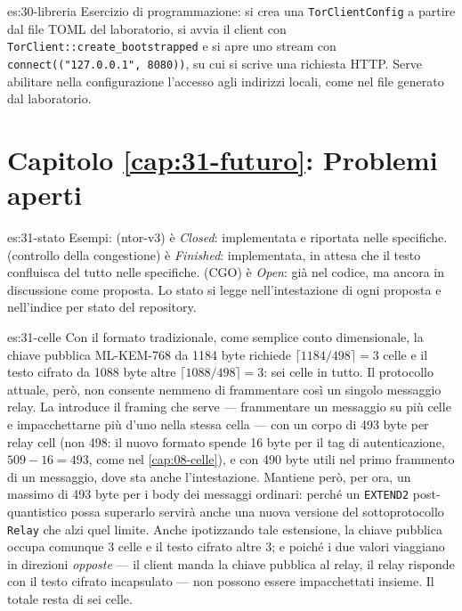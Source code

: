 \begin{soluzione}{es:30-libreria}
Esercizio di programmazione: si crea una \texttt{TorClientConfig} a partire dal file TOML del laboratorio, si avvia il client con \texttt{TorClient::create\_bootstrapped} e si apre uno stream con \texttt{connect(("127.0.0.1", 8080))}, su cui si scrive una richiesta HTTP. Serve abilitare nella configurazione l'accesso agli indirizzi locali, come nel file generato dal laboratorio.
\end{soluzione}

\section*{Capitolo \ref{cap:31-futuro}: Problemi aperti}

\begin{soluzione}{es:31-stato}
Esempi:  (ntor-v3) è \emph{Closed}: implementata e riportata nelle specifiche.  (controllo della congestione) è \emph{Finished}: implementata, in attesa che il testo confluisca del tutto nelle specifiche.  (CGO) è \emph{Open}: già nel codice, ma ancora in discussione come proposta. Lo stato si legge nell'intestazione di ogni proposta e nell'indice per stato del repository.
\end{soluzione}

\begin{soluzione}{es:31-celle}
Con il formato tradizionale, come semplice conto dimensionale, la chiave pubblica ML-KEM-768 da 1184 byte richiede $\lceil 1184/498 \rceil = 3$ celle e il testo cifrato da 1088 byte altre $\lceil 1088/498 \rceil = 3$: sei celle in tutto. Il protocollo attuale, però, non consente nemmeno di frammentare così un singolo messaggio relay. La  introduce il framing che serve --- frammentare un messaggio su più celle e impacchettarne più d'uno nella stessa cella --- con un corpo di 493 byte per relay cell (non 498: il nuovo formato spende 16 byte per il tag di autenticazione, $509 - 16 = 493$, come nel \cref{cap:08-celle}), e con 490 byte utili nel primo frammento di un messaggio, dove sta anche l'intestazione. Mantiene però, per ora, un massimo di 493 byte per i body dei messaggi ordinari: perché un \texttt{EXTEND2} post-quantistico possa superarlo servirà anche una nuova versione del sottoprotocollo \texttt{Relay} che alzi quel limite. Anche ipotizzando tale estensione, la chiave pubblica occupa comunque 3 celle e il testo cifrato altre 3; e poiché i due valori viaggiano in direzioni \emph{opposte} --- il client manda la chiave pubblica al relay, il relay risponde con il testo cifrato incapsulato --- non possono essere impacchettati insieme. Il totale resta di sei celle.
\end{soluzione}

